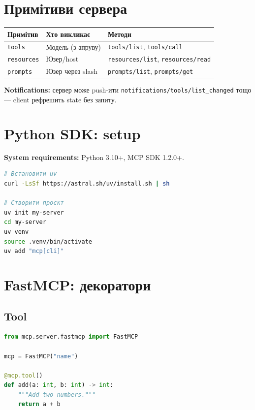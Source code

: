 \documentclass[11pt,a4paper]{article}
\begin{document}
\section{Примітиви сервера}

\begin{tabular}{lll}
\hline
\textbf{Примітив} & \textbf{Хто викликає} & \textbf{Методи} \\
\hline
\texttt{tools} & Модель (з апруву) & \texttt{tools/list}, \texttt{tools/call} \\
\texttt{resources} & Юзер/host & \texttt{resources/list}, \texttt{resources/read} \\
\texttt{prompts} & Юзер через slash & \texttt{prompts/list}, \texttt{prompts/get} \\
\hline
\end{tabular}

\textbf{Notifications:} сервер може push-ити \texttt{notifications/tools/list\_changed} тощо --- client рефрешить state без запиту.

\section{Python SDK: setup}

\textbf{System requirements:} Python 3.10+, MCP SDK 1.2.0+.

\begin{lstlisting}[language=bash]
# Встановити uv
curl -LsSf https://astral.sh/uv/install.sh | sh

# Створити проєкт
uv init my-server
cd my-server
uv venv
source .venv/bin/activate
uv add "mcp[cli]"
\end{lstlisting}

\section{FastMCP: декоратори}

\subsection{Tool}

\begin{lstlisting}[language=python]
from mcp.server.fastmcp import FastMCP

mcp = FastMCP("name")

@mcp.tool()
def add(a: int, b: int) -> int:
    """Add two numbers."""
    return a + b
\end{lstlisting}
\end{document}
